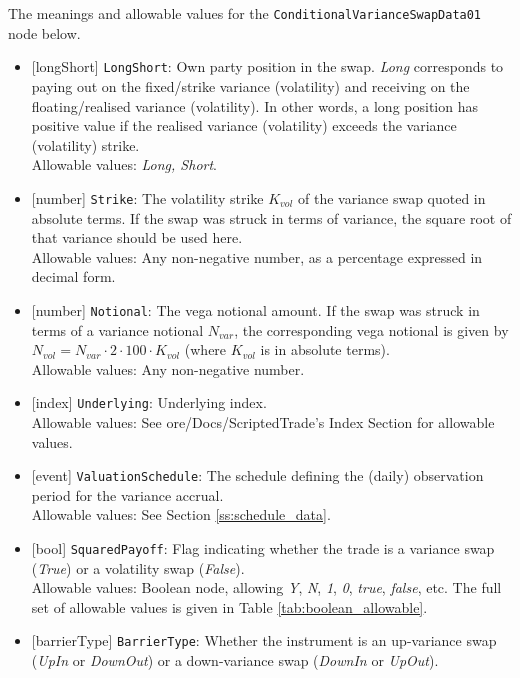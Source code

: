 The meanings and allowable values for the \lstinline!ConditionalVarianceSwapData01! node below.

\begin{itemize}
  \item{}[longShort] \lstinline!LongShort!: Own party position in the swap. \emph{Long} corresponds to paying out on the
  fixed/strike variance (volatility) and receiving on the floating/realised variance (volatility). In other words,
  a long position has positive value if the realised variance (volatility) exceeds the variance (volatility)
  strike. \\
  Allowable values: \emph{Long, Short}.
  \item{}[number] \lstinline!Strike!: The volatility strike $K_{vol}$ of the variance swap quoted in absolute terms.
  If the swap was struck in terms of variance, the square root of that variance should be used here. \\
  Allowable values: Any non-negative number, as a percentage expressed in decimal form.
  \item{}[number] \lstinline!Notional!: The vega notional amount. If the swap was struck in terms of a variance notional
  $N_{var}$, the corresponding vega notional is given by $N_{vol} = N_{var} \cdot 2 \cdot 100 \cdot K_{vol}$ (where
  $K_{vol}$ is in absolute terms). \\
  Allowable values: Any non-negative number.
  \item{}[index] \lstinline!Underlying!: Underlying index. \\
  Allowable values: See ore/Docs/ScriptedTrade's Index Section for allowable values.
  \item{}[event] \lstinline!ValuationSchedule!: The schedule defining the (daily) observation period for the variance accrual. \\
  Allowable values: See Section \ref{ss:schedule_data}.
  \item{}[bool] \lstinline!SquaredPayoff!: Flag indicating whether the trade is a variance swap (\emph{True}) or a volatility
  swap (\emph{False}). \\
  Allowable values: Boolean node, allowing \emph{Y}, \emph{N}, \emph{1}, \emph{0}, \emph{true}, \emph{false}, etc.
  The full set of allowable values is given in Table \ref{tab:boolean_allowable}.
  \item{}[barrierType] \lstinline!BarrierType!: Whether the instrument is an up-variance swap (\emph{UpIn} or \emph{DownOut}) or
  a down-variance swap (\emph{DownIn} or \emph{UpOut}). \\

\end{itemize}
